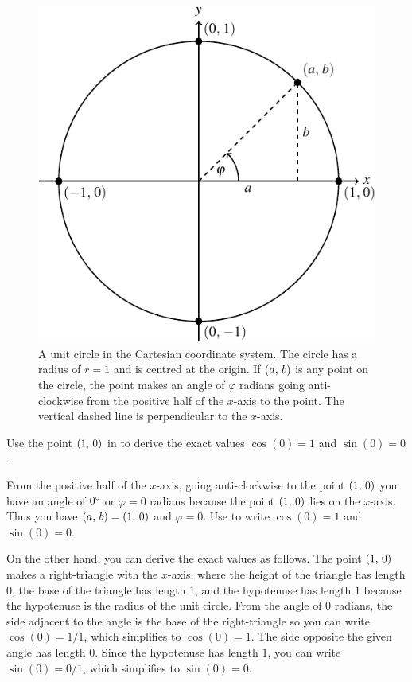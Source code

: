 \documentclass[a4paper,oneside,12pt]{article}
\begin{document}
\begin{figure}[!htbp]
\centering
\includegraphics[scale=1.1]{image/04/unit-circle.pdf}
\caption{%
  A unit circle in the Cartesian coordinate system.  The circle has a
  radius of $r = 1$ and is centred at the origin.  If $\left\lparen{a},\, {b}\right\rparen$
  is any point on the circle, the point makes an angle of $\varphi$
  radians going anti-clockwise from the positive half of the $x$-axis
  to the point.  The vertical dashed line is perpendicular to the
  $x$-axis.
}
\label{fig:point_on_unit_circle}
\end{figure}

\begin{example}
Use the point $\left\lparen{1},\, {0}\right\rparen$ in  to
derive the exact values $\cos(0) = 1$ and $\sin(0) = 0$.
\end{example}

\begin{solution}
From the positive half of the $x$-axis, going anti-clockwise to the
point $\left\lparen{1},\, {0}\right\rparen$ you have an angle of ${0}^{\circ}$ or
$\varphi = 0$ radians because the point $\left\lparen{1},\, {0}\right\rparen$ lies on the
$x$-axis.  Thus you have $\left\lparen{a},\, {b}\right\rparen = \left\lparen{1},\, {0}\right\rparen$ and
$\varphi = 0$.  Use  to
write $\cos(0) = 1$ and $\sin(0) = 0$.

On the other hand, you can derive the exact values as follows.  The
point $\left\lparen{1},\, {0}\right\rparen$ makes a right-triangle with the $x$-axis, where
the height of the triangle has length $0$, the base of the triangle
has length $1$, and the hypotenuse has length $1$ because the
hypotenuse is the radius of the unit circle.  From the angle of $0$
radians, the side adjacent to the angle is the base of the
right-triangle so you can write $\cos(0) = 1 / 1$, which simplifies to
$\cos(0) = 1$.  The side opposite the given angle has length $0$.
Since the hypotenuse has length $1$, you can write $\sin(0) = 0 / 1$,
which simplifies to $\sin(0) = 0$.
\end{solution}
\end{document}
